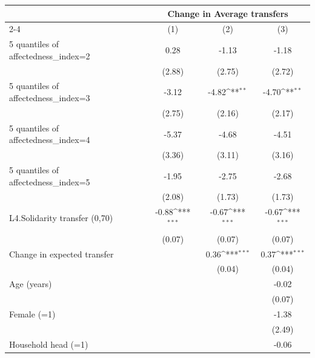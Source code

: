 {
\def\sym#1{\ifmmode^{#1}\else\(^{#1}\)\fi}
\begin{tabular}{l*{3}{c}}
\toprule
                    &\multicolumn{3}{c}{Change in Average transfers}                  \\\cmidrule(lr){2-4}
                    &\multicolumn{1}{c}{(1)}         &\multicolumn{1}{c}{(2)}         &\multicolumn{1}{c}{(3)}         \\
\midrule
5 quantiles of affectedness\_index=2&        0.28         &       -1.13         &       -1.18         \\
                    &      (2.88)         &      (2.75)         &      (2.72)         \\
5 quantiles of affectedness\_index=3&       -3.12         &       -4.82\sym{**} &       -4.70\sym{**} \\
                    &      (2.75)         &      (2.16)         &      (2.17)         \\
5 quantiles of affectedness\_index=4&       -5.37         &       -4.68         &       -4.51         \\
                    &      (3.36)         &      (3.11)         &      (3.16)         \\
5 quantiles of affectedness\_index=5&       -1.95         &       -2.75         &       -2.68         \\
                    &      (2.08)         &      (1.73)         &      (1.73)         \\
L4.Solidarity transfer (0,70)&       -0.88\sym{***}&       -0.67\sym{***}&       -0.67\sym{***}\\
                    &      (0.07)         &      (0.07)         &      (0.07)         \\
Change in expected transfer&                     &        0.36\sym{***}&        0.37\sym{***}\\
                    &                     &      (0.04)         &      (0.04)         \\
Age (years)         &                     &                     &       -0.02         \\
                    &                     &                     &      (0.07)         \\
Female (=1)         &                     &                     &       -1.38         \\
                    &                     &                     &      (2.49)         \\
Household head (=1) &                     &                     &       -0.06         \\

\end{tabular}}
